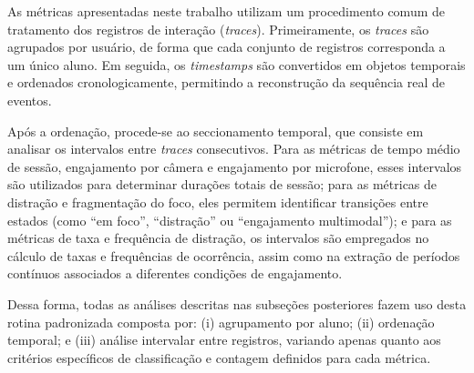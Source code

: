 As métricas apresentadas neste trabalho utilizam um procedimento comum de tratamento dos registros de interação (\textit{traces}). Primeiramente, os \textit{traces} são agrupados por usuário, de forma que cada conjunto de registros corresponda a um único aluno. Em seguida, os \textit{timestamps} são convertidos em objetos temporais e ordenados cronologicamente, permitindo a reconstrução da sequência real de eventos.

Após a ordenação, procede-se ao seccionamento temporal, que consiste em analisar os intervalos entre \textit{traces} consecutivos. Para as métricas de tempo médio de sessão, engajamento por câmera e engajamento por microfone, esses intervalos são utilizados para determinar durações totais de sessão; para as métricas de distração e fragmentação do foco, eles permitem identificar transições entre estados (como ``em foco'', ``distração'' ou ``engajamento multimodal''); e para as métricas de taxa e frequência de distração, os intervalos são empregados no cálculo de taxas e frequências de ocorrência, assim como na extração de períodos contínuos associados a diferentes condições de engajamento.

Dessa forma, todas as análises descritas nas subseções posteriores fazem uso desta rotina padronizada composta por: (i) agrupamento por aluno; (ii) ordenação temporal; e (iii) análise intervalar entre registros, variando apenas quanto aos critérios específicos de classificação e contagem definidos para cada métrica.

